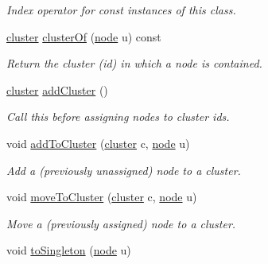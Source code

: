 \begin{DoxyCompactItemize}
\begin{DoxyCompactList}\small\item\em Index operator for const instances of this class. \end{DoxyCompactList}\item 
\hyperlink{namespace_ensemble_clustering_a5ae38234e207add524443be6e597b970}{cluster} \hyperlink{class_ensemble_clustering_1_1_clustering_a5c02c6c1b31e8517f713b978d0c079ea}{cluster\-Of} (\hyperlink{namespace_ensemble_clustering_ae829290aeccd1a420b17a37fd901f114}{node} u) const 
\begin{DoxyCompactList}\small\item\em Return the cluster (id) in which a node is contained. \end{DoxyCompactList}\item 
\hyperlink{namespace_ensemble_clustering_a5ae38234e207add524443be6e597b970}{cluster} \hyperlink{class_ensemble_clustering_1_1_clustering_af6a1379873404b3408d513026005f921}{add\-Cluster} ()
\begin{DoxyCompactList}\small\item\em Call this before assigning nodes to cluster ids. \end{DoxyCompactList}\item 
void \hyperlink{class_ensemble_clustering_1_1_clustering_a2f6334480e3938deae8425dc57e6ea86}{add\-To\-Cluster} (\hyperlink{namespace_ensemble_clustering_a5ae38234e207add524443be6e597b970}{cluster} c, \hyperlink{namespace_ensemble_clustering_ae829290aeccd1a420b17a37fd901f114}{node} u)
\begin{DoxyCompactList}\small\item\em Add a (previously unassigned) node to a cluster. \end{DoxyCompactList}\item 
void \hyperlink{class_ensemble_clustering_1_1_clustering_a7e3a719ed9904897617a3152bf80a634}{move\-To\-Cluster} (\hyperlink{namespace_ensemble_clustering_a5ae38234e207add524443be6e597b970}{cluster} c, \hyperlink{namespace_ensemble_clustering_ae829290aeccd1a420b17a37fd901f114}{node} u)
\begin{DoxyCompactList}\small\item\em Move a (previously assigned) node to a cluster. \end{DoxyCompactList}\item 
void \hyperlink{class_ensemble_clustering_1_1_clustering_a461a251d674b64cf29e97408c343253a}{to\-Singleton} (\hyperlink{namespace_ensemble_clustering_ae829290aeccd1a420b17a37fd901f114}{node} u)

\end{DoxyCompactItemize}
